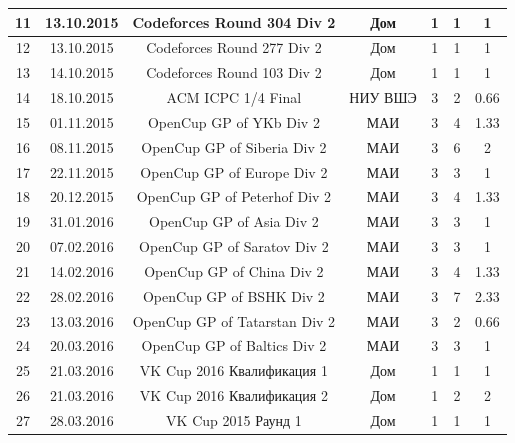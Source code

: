 \documentclass[a4paper,12pt]{article}
\begin{document}
\begin{table}[ht!]
\begin{tabular}{|c|c|c|c|c|c|c|}
11 & 13.10.2015 & Codeforces Round 304 Div 2 & Дом & 1 & 1 & 1    \\ \hline

12 & 13.10.2015 & Codeforces Round 277 Div 2 & Дом & 1 & 1 & 1    \\ \hline

13 & 14.10.2015 & Codeforces Round 103 Div 2 & Дом & 1 & 1 & 1    \\ \hline

14 & 18.10.2015 & ACM ICPC 1/4 Final 	 & НИУ ВШЭ & 3 & 2 & 0.66 \\ \hline

15 & 01.11.2015 & OpenCup GP of YKb Div 2    & МАИ & 3 & 4 & 1.33 \\ \hline

16 & 08.11.2015 & OpenCup GP of Siberia Div 2 & МАИ & 3 & 6 & 2 		 \\ \hline

17 & 22.11.2015 & OpenCup GP of Europe Div 2  & МАИ & 3 & 3 & 1 		 \\ \hline

18 & 20.12.2015 & OpenCup GP of Peterhof Div 2 & МАИ & 3 & 4 & 1.33  	 \\ \hline

19 & 31.01.2016 & OpenCup GP of Asia Div 2	   & МАИ & 3 & 3 & 1 	 	 \\ \hline

20 & 07.02.2016 & OpenCup GP of Saratov 	Div 2  & МАИ & 3 & 3 & 1 		 \\ \hline

21 & 14.02.2016 & OpenCup GP of China Div 2    & МАИ & 3 & 4 & 1.33 	 \\ \hline

22 & 28.02.2016 & OpenCup GP of BSHK Div 2 & МАИ & 3 & 7 & 2.33 \\ \hline

23 & 13.03.2016 & OpenCup GP of Tatarstan Div 2     & МАИ & 3 & 2 & 0.66 \\ \hline

24 & 20.03.2016 & OpenCup GP of Baltics Div 2  & МАИ & 3 & 3 & 1	   \\ \hline

25 & 21.03.2016 & VK Cup 2016 Квалификация 1   & Дом & 1 & 1 & 1 	  \\ \hline

26 & 21.03.2016 & VK Cup 2016 Квалификация 2   & Дом & 1 & 2 & 2 	  \\ \hline

27 & 28.03.2016 & VK Cup 2015 Раунд 1 		   & Дом & 1 & 1 & 1 	  \\ \hline


\end{tabular}
\end{table}
\end{document}
